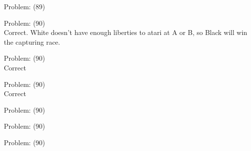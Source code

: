 \documentclass[11pt]{article}
\begin{document}
\begin{minipage}[t]{0.5\textwidth}
  {\centering
  
  Problem: (89)\\
  
  }
\end{minipage}
\begin{minipage}[t]{0.5\textwidth}
  {\centering
  
  Problem: (90)\\
  Correct. White doesn't have enough liberties to atari at A or B, so Black will win the capturing race.\\
  }
\end{minipage}
\begin{minipage}[t]{0.5\textwidth}
  {\centering
  
  Problem: (90)\\
  Correct\\
  }
\end{minipage}
\begin{minipage}[t]{0.5\textwidth}
  {\centering
  
  Problem: (90)\\
  Correct\\
  }
\end{minipage}
\begin{minipage}[t]{0.5\textwidth}
  {\centering
  
  Problem: (90)\\
  
  }
\end{minipage}
\begin{minipage}[t]{0.5\textwidth}
  {\centering
  
  Problem: (90)\\
  
  }
\end{minipage}
\begin{minipage}[t]{0.5\textwidth}
  {\centering
  
  Problem: (90)\\
  
  }
\end{minipage}
\end{document}
